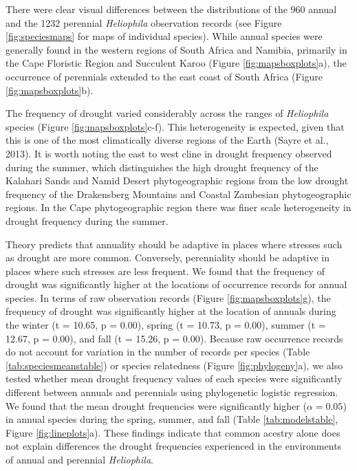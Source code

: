 \documentclass[man,floatsintext]{apa6}
\theoremstyle{definition}
\theoremstyle{definition}
\theoremstyle{definition}
\theoremstyle{remark}
\begin{document}
There were clear visual differences between the distributions of the 960
annual and the 1232 perennial \emph{Heliophila} observation records (see
Figure \ref{fig:speciesmaps} for maps of individual species). While
annual species were generally found in the western regions of South
Africa and Namibia, primarily in the Cape Floristic Region and Succulent
Karoo (Figure \ref{fig:mapsboxplots}a), the occurrence of perennials
extended to the east coast of South Africa (Figure
\ref{fig:mapsboxplots}b).

The frequency of drought varied considerably across the ranges of
\emph{Heliophila} species (Figure \ref{fig:mapsboxplots}c-f). This
heterogeneity is expected, given that this is one of the most
climatically diverse regions of the Earth (Sayre et al., 2013). It is
worth noting the east to west cline in drought frequency observed during
the summer, which distinguishes the high drought frequency of the
Kalahari Sands and Namid Desert phytogeographic regions from the low
drought frequency of the Drakensberg Mountains and Coastal Zambesian
phytogeographic regions. In the Cape phytogeographic region there was
finer scale heterogeneity in drought frequency during the summer.

Theory predicts that annuality should be adaptive in places where
stresses such as drought are more common. Conversely, perenniality
should be adaptive in places where such stresses are less frequent. We
found that the frequency of drought was significantly higher at the
locations of occurrence records for annual species. In terms of raw
observation records (Figure \ref{fig:mapsboxplots}g), the frequency of
drought was significantly higher at the location of annuals during the
winter (t = 10.65, p = 0.00), spring (t = 10.73, p = 0.00), summer (t =
12.67, p = 0.00), and fall (t = 15.26, p = 0.00). Because raw occurrence
records do not account for variation in the number of records per
species (Table \ref{tab:speciesmeanstable}) or species relatedness
(Figure \ref{fig:phylogeny}a), we also tested whether mean drought
frequency values of each species were significantly different between
annuals and perennials using phylogenetic logistic regression. We found
that the mean drought frequencies were significantly higher
(\(\alpha = 0.05\)) in annual species during the spring, summer, and
fall (Table \ref{tab:modelstable}, Figure \ref{fig:lineplots}a). These
findings indicate that common acestry alone does not explain differences
the drought frequencies experienced in the environments of annual and
perennial \emph{Heliophila}.
\end{document}
